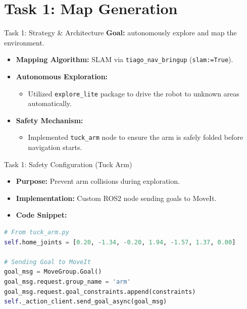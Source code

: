\section{Task 1: Map Generation}

\begin{frame}{Task 1: Strategy \& Architecture}
    \textbf{Goal:} autonomously explore and map the environment.
    \vspace{0.5cm}
    \begin{itemize}
        \item \textbf{Mapping Algorithm:} SLAM via \texttt{tiago\_nav\_bringup} (\texttt{slam:=True}).
        \item \textbf{Autonomous Exploration:} 
            \begin{itemize}
                \item Utilized \texttt{explore\_lite} package to drive the robot to unknown areas automatically.
            \end{itemize}
        \item \textbf{Safety Mechanism:} 
            \begin{itemize}
                \item Implemented \texttt{tuck\_arm} node to ensure the arm is safely folded before navigation starts.
            \end{itemize}
    \end{itemize}
\end{frame}

\begin{frame}[fragile]{Task 1: Safety Configuration (Tuck Arm)}
    \begin{itemize}
        \item \textbf{Purpose:} Prevent arm collisions during exploration.
        \item \textbf{Implementation:} Custom ROS2 node sending goals to MoveIt.
        \item \textbf{Code Snippet:}
    \end{itemize}
    \begin{lstlisting}[language=Python]
# From tuck_arm.py
self.home_joints = [0.20, -1.34, -0.20, 1.94, -1.57, 1.37, 0.00]

# Sending Goal to MoveIt
goal_msg = MoveGroup.Goal()
goal_msg.request.group_name = 'arm'
goal_msg.request.goal_constraints.append(constraints)
self._action_client.send_goal_async(goal_msg)
    \end{lstlisting}
\end{frame}


